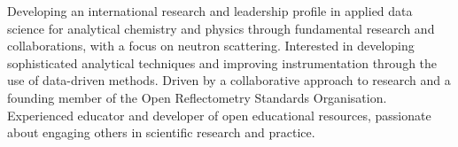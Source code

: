\vspace{0.25cm}

\begin{cvparagraph}

Developing an international research and leadership profile in applied data science for analytical chemistry and physics through fundamental research and collaborations, with a focus on neutron scattering.
Interested in developing sophisticated analytical techniques and improving instrumentation through the use of data-driven methods.
Driven by a collaborative approach to research and a founding member of the Open Reflectometry Standards Organisation.
Experienced educator and developer of open educational resources, passionate about engaging others in scientific research and practice.
\end{cvparagraph}
